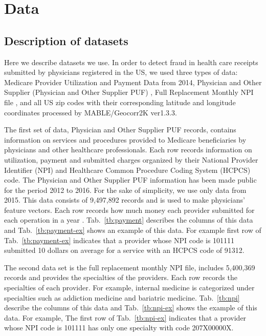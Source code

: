 \documentclass[dvipdfmx, english]{ampmt}             %
\newcommand{\Tabref}[1]{Tab.~\ref{#1}}
\begin{document}
\section{Data}\label{sec:data}

\subsection{Description of datasets}
Here we describe datasets we use. In order to detect fraud in health care receipts submitted by physicians registered in the US, we used three types of data: Medicare Provider Utilization and Payment Data from 2014, Physician and Other Supplier (Physician and Other Supplier PUF) \cite{PhysiAndOther}, Full Replacement Monthly NPI file \cite{NpiFile}, and all US zip codes with their corresponding latitude and longitude coordinates processed by MABLE/Geocorr2K ver1.3.3\cite{GeoCor}.

The first set of data, Physician and Other Supplier PUF records, contains information on services and procedures provided to Medicare beneficiaries by physicians and other healthcare professionals. Each row records information on utilization, payment and submitted charges organized by their National Provider Identifier (NPI) and Healthcare Common Procedure Coding System (HCPCS) code. The Physician and Other Supplier PUF information has been made public for the period 2012 to 2016.
For the sake of simplicity, we use only data from 2015. This data consists of  9,497,892 records and is used to make physicians'{} feature vectors. Each row records how much money each provider submitted for each operation in a year \cite{Puf}. \Tabref{tb:payment} describes the columns of this data and \Tabref{tb:payment-ex} shows an 
example of this data. For example first row of \Tabref{tb:payment-ex} indicates that a provider whose NPI code is 101111 submitted 10 dollars on average for a service with an HCPCS code of 91312.
\par

The second data set is the full replacement monthly NPI file, includes 5,400,369 records and provides the specialties of the providers.  Each row records the specialties of each provider. For example, internal medicine is categorized under specialties such as addiction medicine and bariatric medicine.
\Tabref{tb:npi} describe the columns of this data and \Tabref{tb:npi-ex} shows the example of this data. For example, The first row of \Tabref{tb:npi-ex} indicates that a provider whose NPI code is 101111 has only one specialty with code 207X00000X.
\par
\end{document}
